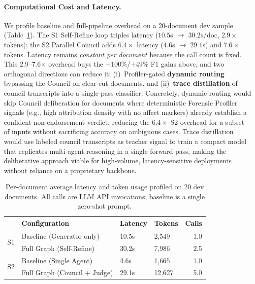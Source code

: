 \documentclass[11pt]{article}
\begin{document}
\paragraph{Computational Cost and Latency.}
We profile baseline and full-pipeline overhead on a 20-document dev sample (Table~\ref{tab:latency}). The S1 Self-Refine loop triples latency ($10.5$s $\to$ $30.2$s/doc, $2.9\times$ tokens); the S2 Parallel Council adds $6.4\times$ latency ($4.6$s $\to$ $29.1$s) and $7.6\times$ tokens. Latency remains \emph{constant per document} because the call count is fixed. This 2.9--7.6$\times$ overhead buys the +100\%/+49\% F1 gains above, and two orthogonal directions can reduce it: (i)~Profiler-gated \textbf{dynamic routing} bypassing the Council on clear-cut documents, and (ii)~\textbf{trace distillation} of council transcripts into a single-pass classifier.
Concretely, dynamic routing would skip Council deliberation for documents where deterministic Forensic Profiler signals (e.g., high attribution density with no affect markers) already establish a confident non-endorsement verdict, reducing the $6.4\times$ S2 overhead for a subset of inputs without sacrificing accuracy on ambiguous cases.
Trace distillation would use labeled council transcripts as teacher signal to train a compact model that replicates multi-agent reasoning in a single forward pass, making the deliberative approach viable for high-volume, latency-sensitive deployments without reliance on a proprietary backbone.



\begin{table}[htbp]
	\centering
	\small
	\begin{tabular}{p{0.1cm}p{3.7cm}p{0.8cm}p{0.6cm}r}
		\toprule
		\textbf{} & \textbf{Configuration} & \textbf{Latency} & \textbf{Tokens} & \textbf{Calls} \\
		\midrule
		\multirow{2}{*}{S1} & Baseline (Generator only) & 10.5s & 2{,}549 & 1.0 \\
		                    & Full Graph (Self-Refine)   & 30.2s & 7{,}986 & 2.5 \\
		\midrule
		\multirow{2}{*}{S2} & Baseline (Single Agent)       & 4.6s  & 1{,}665 & 1.0 \\
		                    & Full Graph (Council + Judge)   & 29.1s & 12{,}627 & 5.0 \\
		\bottomrule
	\end{tabular}
	\caption{Per-document average latency and token usage profiled on 20 dev documents. All calls are LLM API invocations; baseline is a single zero-shot prompt.}
	\label{tab:latency}
\end{table}
\end{document}
